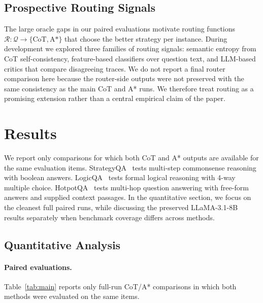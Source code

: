 \documentclass[11pt]{article}
\begin{document}
\subsection{Prospective Routing Signals}

The large oracle gaps in our paired evaluations motivate routing functions $\mathcal{R}: \mathcal{Q} \to \{\text{CoT}, \text{A*}\}$ that choose the better strategy per instance. During development we explored three families of routing signals: semantic entropy from CoT self-consistency, feature-based classifiers over question text, and LLM-based critics that compare disagreeing traces. We do not report a final router comparison here because the router-side outputs were not preserved with the same consistency as the main CoT and A* runs. We therefore treat routing as a promising extension rather than a central empirical claim of the paper.

\section{Results}
\label{sec:results}

We report only comparisons for which both CoT and A* outputs are available for the same evaluation items. StrategyQA~\cite{geva2021did} tests multi-step commonsense reasoning with boolean answers. LogicQA~\cite{liu2020logiqa} tests formal logical reasoning with 4-way multiple choice. HotpotQA~\cite{yang2018hotpotqa} tests multi-hop question answering with free-form answers and supplied context passages. In the quantitative section, we focus on the cleanest full paired runs, while discussing the preserved LLaMA-3.1-8B results separately when benchmark coverage differs across methods.

\subsection{Quantitative Analysis}
\label{sec:quantitative}

\paragraph{Paired evaluations.} Table~\ref{tab:main} reports only full-run CoT/A* comparisons in which both methods were evaluated on the same items.
\end{document}
